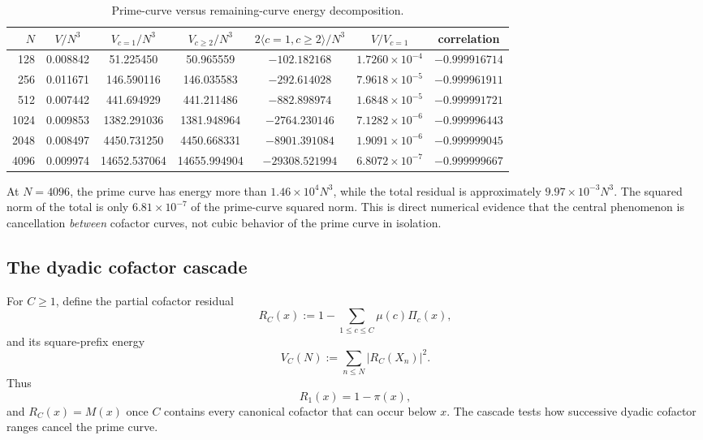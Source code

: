 \documentclass[11pt]{article}
\theoremstyle{definition}
\theoremstyle{remark}
\newcommand{\1}{\mathbf{1}}
\begin{document}
\begin{table}[htbp]
\centering
\caption{Prime-curve versus remaining-curve energy decomposition.}
\label{tab:prime-curve-decomposition}
\scriptsize
\setlength{\tabcolsep}{3.2pt}
\begin{tabular}{rcccccc}
\toprule
$N$ &
$V/N^3$ &
$V_{c=1}/N^3$ &
$V_{c\ge2}/N^3$ &
$2\langle c=1,c\ge2\rangle/N^3$ &
$V/V_{c=1}$ &
correlation\\
\midrule
128  & 0.008842 & 51.225450 & 50.965559 & $-102.182168$ & $1.7260\!\times10^{-4}$ & $-0.999916714$\\
256  & 0.011671 & 146.590116 & 146.035583 & $-292.614028$ & $7.9618\!\times10^{-5}$ & $-0.999961911$\\
512  & 0.007442 & 441.694929 & 441.211486 & $-882.898974$ & $1.6848\!\times10^{-5}$ & $-0.999991721$\\
1024 & 0.009853 & 1382.291036 & 1381.948964 & $-2764.230146$ & $7.1282\!\times10^{-6}$ & $-0.999996443$\\
2048 & 0.008497 & 4450.731250 & 4450.668331 & $-8901.391084$ & $1.9091\!\times10^{-6}$ & $-0.999999045$\\
4096 & 0.009974 & 14652.537064 & 14655.994904 & $-29308.521994$ & $6.8072\!\times10^{-7}$ & $-0.999999667$\\
\bottomrule
\end{tabular}
\end{table}

At $N=4096$, the prime curve has energy more than
$1.46\times10^4N^3$, while the total residual is approximately
$9.97\times10^{-3}N^3$.  The squared norm of the total is only
$6.81\times10^{-7}$ of the prime-curve squared norm.  This is direct
numerical evidence that the central phenomenon is cancellation
\emph{between} cofactor curves, not cubic behavior of the prime curve
in isolation.


\subsection{The dyadic cofactor cascade}
\label{subsec:cofactor-cascade}

For $C\ge1$, define the partial cofactor residual
\begin{equation}
 R_C(x)
 :=
 1-\sum_{1\le c\le C}\mu(c)\Pi_c(x),
 \label{eq:R-C}
\end{equation}
and its square-prefix energy
\begin{equation}
 V_C(N)
 :=
 \sum_{n\le N}|R_C(X_n)|^2.
 \label{eq:V-C}
\end{equation}
Thus
\[
 R_1(x)=1-\pi(x),
\]
and $R_C(x)=M(x)$ once $C$ contains every canonical cofactor that can
occur below $x$.  The cascade tests how successive dyadic cofactor
ranges cancel the prime curve.
\end{document}
